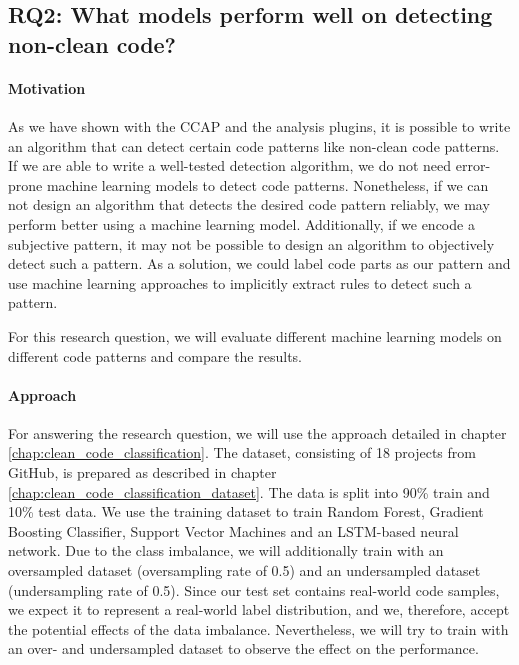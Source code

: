 \subsection{RQ2: What models perform well on detecting non-clean code?}
\paragraph{Motivation}
As we have shown with the CCAP and the analysis plugins, it is possible to write an algorithm that can detect certain code patterns like non-clean code patterns. If we are able to write a well-tested detection algorithm, we do not need error-prone machine learning models to detect code patterns. Nonetheless, if we can not design an algorithm that detects the desired code pattern reliably, we may perform better using a machine learning model. Additionally, if we encode a subjective pattern, it may not be possible to design an algorithm to objectively detect such a pattern. As a solution, we could label code parts as our pattern and use machine learning approaches to implicitly extract rules to detect such a pattern.

For this research question, we will evaluate different machine learning models on different code patterns and compare the results.

\paragraph{Approach}
For answering the research question, we will use the approach detailed in chapter \ref{chap:clean_code_classification}.  The dataset, consisting of 18 projects from GitHub, is prepared as described in chapter \ref{chap:clean_code_classification_dataset}. The data is split into 90\% train and 10\% test data. We use the training dataset to train Random Forest, Gradient Boosting Classifier, Support Vector Machines and an LSTM-based neural network. Due to the class imbalance, we will additionally train with an oversampled dataset (oversampling rate of 0.5) and an undersampled dataset (undersampling rate of 0.5). Since our test set contains real-world code samples, we expect it to represent a real-world label distribution, and we, therefore, accept the potential effects of the data imbalance. Nevertheless, we will try to train with an over- and undersampled dataset to observe the effect on the performance.

